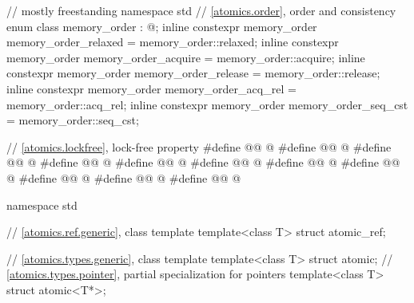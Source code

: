 %
\begin{codeblock}
// mostly freestanding
namespace std {
  // \ref{atomics.order}, order and consistency
  enum class memory_order : @\unspecnc@;
  inline constexpr memory_order memory_order_relaxed = memory_order::relaxed;
  inline constexpr memory_order memory_order_acquire = memory_order::acquire;
  inline constexpr memory_order memory_order_release = memory_order::release;
  inline constexpr memory_order memory_order_acq_rel = memory_order::acq_rel;
  inline constexpr memory_order memory_order_seq_cst = memory_order::seq_cst;
}

// \ref{atomics.lockfree}, lock-free property
#define @@ @\unspecnc@
#define @@ @\unspecnc@
#define @@ @\unspecnc@
#define @@ @\unspecnc@
#define @@ @\unspecnc@
#define @@ @\unspecnc@
#define @@ @\unspecnc@
#define @@ @\unspecnc@
#define @@ @\unspecnc@
#define @@ @\unspecnc@
#define @@ @\unspecnc@

namespace std {
  // \ref{atomics.ref.generic}, class template 
  template<class T> struct atomic_ref;

  // \ref{atomics.types.generic}, class template 
  template<class T> struct atomic;
  // \ref{atomics.types.pointer}, partial specialization for pointers
  template<class T> struct atomic<T*>;

}
\end{codeblock}
